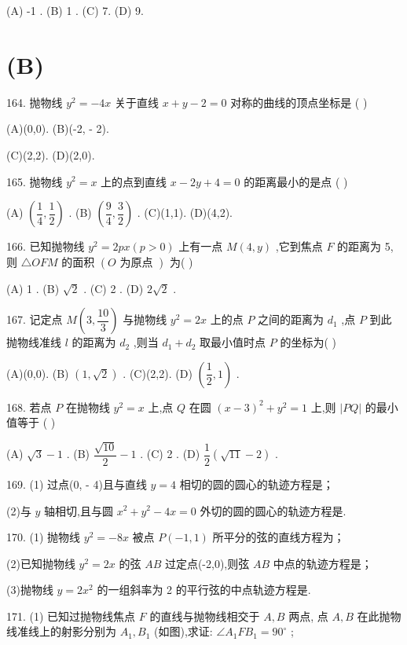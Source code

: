 (A) -1 . (B) 1 . (C) 7. (D) 9.

\section*{(B)}

164. 抛物线 ${y}^{2} =  - {4x}$ 关于直线 $x + y - 2 = 0$ 对称的曲线的顶点坐标是 (   )

(A)(0,0). (B)(-2, - 2).

(C)(2,2). (D)(2,0).

165. 抛物线 ${y}^{2} = x$ 上的点到直线 $x - {2y} + 4 = 0$ 的距离最小的是点 (   )

(A) $\left( {\dfrac{1}{4},\dfrac{1}{2}}\right)$ . (B) $\left( {\dfrac{9}{4},\dfrac{3}{2}}\right)$ . (C)(1,1). (D)(4,2).

166. 已知抛物线 ${y}^{2} = {2px}\left( {p > 0}\right)$ 上有一点 $M\left( {4,y}\right)$ ,它到焦点 $F$ 的距离为 5,则 $\bigtriangleup {OFM}$ 的面积 $\left( {O\text{ 为原点 }}\right)$ 为(   )

(A) 1 . (B) $\sqrt{2}$ . (C) 2 . (D) $2\sqrt{2}$ .

167. 记定点 $M\left( {3,\dfrac{10}{3}}\right)$ 与抛物线 ${y}^{2} = {2x}$ 上的点 $P$ 之间的距离为 ${d}_{1}$ ,点 $P$ 到此抛物线准线 $l$ 的距离为 ${d}_{2}$ ,则当 ${d}_{1} + {d}_{2}$ 取最小值时点 $P$ 的坐标为(   )

(A)(0,0). (B) $\left( {1,\sqrt{2}}\right)$ . (C)(2,2). (D) $\left( {\dfrac{1}{2},1}\right)$ .

168. 若点 $P$ 在抛物线 ${y}^{2} = x$ 上,点 $Q$ 在圆 ${\left( x - 3\right) }^{2} + {y}^{2} = 1$ 上,则 $\left| {PQ}\right|$ 的最小值等于 (   )

(A) $\sqrt{3} - 1$ . (B) $\dfrac{\sqrt{10}}{2} - 1$ . (C) 2 . (D) $\dfrac{1}{2}\left( {\sqrt{11} - 2}\right)$ .

169. (1) 过点(0, - 4)且与直线 $y = 4$ 相切的圆的圆心的轨迹方程是\blkda{}；

(2)与 $y$ 轴相切,且与圆 ${x}^{2} + {y}^{2} - {4x} = 0$ 外切的圆的圆心的轨迹方程是\blkda{}.

170. (1) 抛物线 ${y}^{2} =  - {8x}$ 被点 $P\left( {-1,1}\right)$ 所平分的弦的直线方程为\blkda{}；

(2)已知抛物线 ${y}^{2} = {2x}$ 的弦 ${AB}$ 过定点(-2,0),则弦 ${AB}$ 中点的轨迹方程是\blkda{}；

(3)抛物线 $y = 2{x}^{2}$ 的一组斜率为 2 的平行弦的中点轨迹方程是\blkda{}.

171. (1) 已知过抛物线焦点 $F$ 的直线与抛物线相交于 $A,B$ 两点, 点 $A,B$ 在此抛物线准线上的射影分别为 ${A}_{1},{B}_{1}$ (如图),求证: $\angle {A}_{1}F{B}_{1} = {90}^{ \circ  }$ ;

